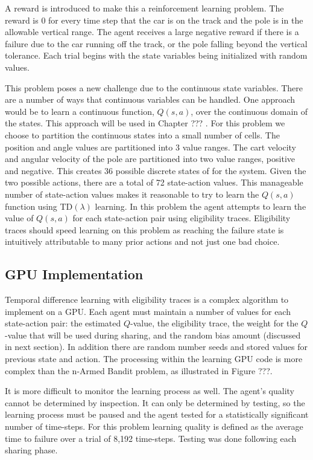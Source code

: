 \documentclass[11pt]{article} %
\begin{document}
\begin{flushleft}


A reward is introduced to make this a reinforcement learning problem.  The reward is 0 for every time step that the car is on the track and the pole is in the allowable vertical range.  The agent receives a large negative reward if there is a failure due to the car running off the track, or the pole falling beyond the vertical tolerance.  Each trial begins with the state variables being initialized with random values.

This problem poses a new challenge due to the continuous state variables.  There are a number of ways that continuous variables can be handled.  One approach would be to learn a continuous function, $Q(s,a)$, over the continuous domain of the states.  This approach will be used in Chapter ??? .  For this problem we choose to partition the continuous states into a small number of cells.  The position and angle values are partitioned into 3 value ranges.  The cart velocity and angular velocity of the pole are partitioned into two value ranges, positive and negative.  This creates 36 possible discrete states of for the system.  Given the two possible actions, there are a total of 72 state-action values.  This manageable number of state-action values makes it reasonable to try to learn the $Q(s,a)$ function using TD$(\lambda)$ learning.  In this problem the agent attempts to learn the value of $Q(s,a)$ for each state-action pair using eligibility traces.  Eligibility traces should speed learning on this problem as reaching the failure state is intuitively attributable to many prior actions and not just one bad choice.

\subsection{GPU Implementation}
Temporal difference learning with eligibility traces is a complex algorithm to implement on a GPU.  Each agent must maintain a number of values for each state-action pair: the estimated $Q$-value, the eligibility trace, the weight for the $Q$-value that will be used during sharing, and the random bias amount (discussed in next section).   In addition there are random number seeds and stored values for previous state and action.  The processing within the learning GPU code is more complex than the n-Armed Bandit problem, as illustrated in Figure ???.

It is more difficult to monitor the learning process as well.  The agent’s quality cannot be determined by inspection.  It can only be determined by testing, so the learning process must be paused and the agent tested for a statistically significant number of time-steps.  For this problem learning quality is defined as the average time to failure over a trial of 8,192 time-steps.  Testing was done following each sharing phase. 


\end{flushleft}
\end{document}
